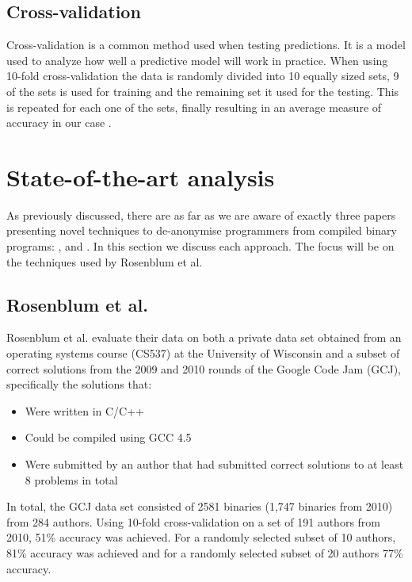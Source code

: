 \documentclass[a4paper,11pt]{kth-mag}
\begin{document}
\subsection{Cross-validation}
Cross-validation is a common method used when testing predictions. It is a
model used to analyze how well a predictive model will work in practice. When
using 10-fold cross-validation the data is randomly divided into 10 equally
sized sets, 9 of the sets is used for training and the remaining set it used
for the testing. This is repeated for each one of the sets, finally resulting
in an average measure of accuracy in our case \parencite{hsu2003practical}.        

\section{State-of-the-art analysis}
As previously discussed, there are as far as we are aware of exactly three
papers presenting novel techniques to de-anonymise programmers from compiled
binary programs: \parencite{rosenblum2011wrote}, \parencite{alrabaee2014oba2}
and \parencite{caliskan2015coding}. In this section we discuss each approach.
The focus will be on the techniques used by Rosenblum et al.

\subsection{Rosenblum et al.}
Rosenblum et al. evaluate their data on both a private data set obtained from
an operating systems course (CS537) at the University of Wisconsin and a subset
of correct solutions from the 2009 and 2010 rounds of the Google Code Jam
(GCJ), specifically the solutions that:

\begin{itemize}
\item Were written in C/C++
\item Could be compiled using GCC 4.5 
\item Were submitted by an author that had submitted correct solutions to at
      least 8 problems in total
\end{itemize}

In total, the GCJ data set consisted of 2581 binaries (1,747 binaries from
2010) from 284 authors. Using 10-fold cross-validation on a set of 191 authors
from 2010, 51\% accuracy was achieved. For a randomly selected subset of 10
authors, 81\% accuracy was achieved and for a randomly selected subset of 20
authors 77\% accuracy.
\end{document}
